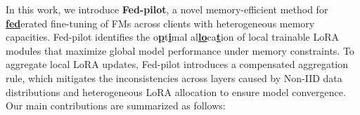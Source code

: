 \documentclass[sigconf]{acmart}
\begin{document}
In this work, we introduce \textbf{Fed-pilot}, a novel memory-efficient method for \textbf{\uline{fed}}erated fine-tuning of FMs across clients with heterogeneous memory capacities. Fed-pilot identifies the o\textbf{\uline{p}}t\textbf{\uline{i}}mal al\textbf{\uline{lo}}ca\textbf{\uline{t}}ion of local trainable LoRA modules that maximize global model performance under memory constraints. To aggregate local LoRA updates, Fed-pilot introduces a compensated aggregation rule, which mitigates the inconsistencies across layers caused by Non-IID data distributions and heterogeneous LoRA allocation to ensure model convergence.
% 
% 
%
%
% 
Our main contributions are summarized as follows:
\end{document}

